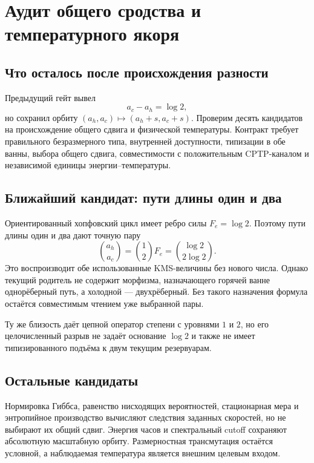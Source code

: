 \chapter{Аудит общего сродства и температурного якоря}
\label{ch:v10-two-reservoir-common-affinity-audit}

\section{Что осталось после происхождения разности}

Предыдущий гейт вывел
\begin{equation}
 a_c-a_h=\log2,
\end{equation}
но сохранил орбиту $(a_h,a_c)\mapsto(a_h+s,a_c+s)$. Проверим десять
кандидатов на происхождение общего сдвига и физической температуры.
Контракт требует правильного безразмерного типа, внутренней доступности,
типизации в обе ванны, выбора общего сдвига, совместимости с положительным
CPTP-каналом и независимой единицы энергии--температуры.

\section{Ближайший кандидат: пути длины один и два}

Ориентированный хопфовский цикл имеет ребро силы $F_e=\log2$. Поэтому пути
длины один и два дают точную пару
\begin{equation}
 \binom{a_h}{a_c}
 =\binom{1}{2}F_e
 =\binom{\log2}{2\log2}.
 \label{eq:v10-common-affinity-hopf-path-candidate}
\end{equation}
Это воспроизводит обе использованные KMS-величины без нового числа.
Однако текущий родитель не содержит морфизма, назначающего горячей ванне
однорёберный путь, а холодной --- двухрёберный. Без такого назначения
формула остаётся совместимым чтением уже выбранной пары.

Ту же близость даёт цепной оператор степени с уровнями $1$ и $2$, но его
целочисленный разрыв не задаёт основание $\log2$ и также не имеет
типизированного подъёма к двум текущим резервуарам.

\section{Остальные кандидаты}

Нормировка Гиббса, равенство нисходящих вероятностей, стационарная мера и
энтропийное производство вычисляют следствия заданных скоростей, но не
выбирают их общий сдвиг. Энергия часов и спектральный cutoff сохраняют
абсолютную масштабную орбиту. Размерностная трансмутация остаётся условной,
а наблюдаемая температура является внешним целевым входом.

